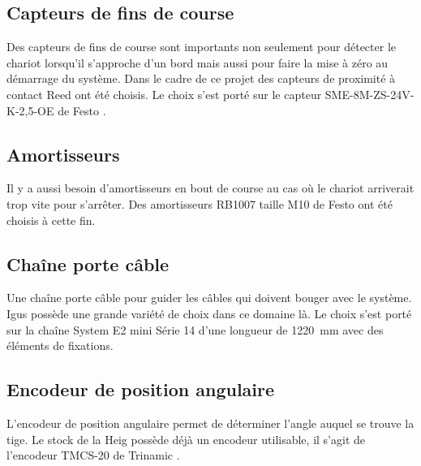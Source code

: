 \subsection{Capteurs de fins de course}
Des capteurs de fins de course sont importants non seulement pour détecter le chariot lorsqu'il s'approche d'un bord mais aussi
pour faire la mise à zéro au démarrage du système. Dans le cadre de ce projet des capteurs de proximité à contact Reed ont été choisis.
Le choix s'est porté sur le capteur SME-8M-ZS-24V-K-2,5-OE de Festo \cite{Festo}.

\subsection{Amortisseurs}
Il y a aussi besoin d'amortisseurs en bout de course au cas où le chariot arriverait trop vite pour s'arrêter. Des amortisseurs RB1007 taille M10
de Festo \cite{Festo} ont été choisis à cette fin.

\subsection{Chaîne porte câble}
Une chaîne porte câble pour guider les câbles qui doivent bouger avec le système. Igus \cite{Igus} possède une grande variété de choix dans
ce domaine là. Le choix s'est porté sur la chaîne System E2 mini Série 14 d'une longueur de 1220~mm avec des éléments de fixations.

\subsection{Encodeur de position angulaire}
L'encodeur de position angulaire permet de déterminer l'angle auquel se trouve la tige. Le stock de la \acrshort{Heig} possède déjà un encodeur
utilisable, il s'agit de l'encodeur TMCS-20 de Trinamic \cite{Trinamic}.